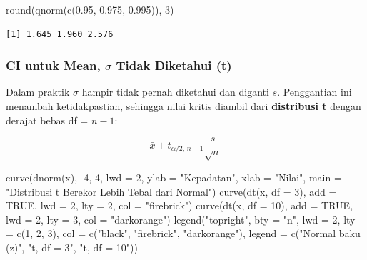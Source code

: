 \documentclass[
  indonesian,
  letterpaper,
]{book}
\newenvironment{Shaded}{\begin{snugshade}}{\end{snugshade}}
\newcommand{\AttributeTok}[1]{\textcolor[rgb]{0.40,0.45,0.13}{#1}}
\newcommand{\ConstantTok}[1]{\textcolor[rgb]{0.56,0.35,0.01}{#1}}
\newcommand{\DecValTok}[1]{\textcolor[rgb]{0.68,0.00,0.00}{#1}}
\newcommand{\FloatTok}[1]{\textcolor[rgb]{0.68,0.00,0.00}{#1}}
\newcommand{\FunctionTok}[1]{\textcolor[rgb]{0.28,0.35,0.67}{#1}}
\newcommand{\NormalTok}[1]{\textcolor[rgb]{0.00,0.23,0.31}{#1}}
\newcommand{\SpecialCharTok}[1]{\textcolor[rgb]{0.37,0.37,0.37}{#1}}
\newcommand{\StringTok}[1]{\textcolor[rgb]{0.13,0.47,0.30}{#1}}
\begin{document}
\begin{Shaded}
\begin{Highlighting}[]
\FunctionTok{round}\NormalTok{(}\FunctionTok{qnorm}\NormalTok{(}\FunctionTok{c}\NormalTok{(}\FloatTok{0.95}\NormalTok{, }\FloatTok{0.975}\NormalTok{, }\FloatTok{0.995}\NormalTok{)), }\DecValTok{3}\NormalTok{)}
\end{Highlighting}
\end{Shaded}

\begin{verbatim}
[1] 1.645 1.960 2.576
\end{verbatim}

\subsubsection{\texorpdfstring{CI untuk Mean, \(\sigma\) Tidak Diketahui
(t)}{CI untuk Mean, \textbackslash sigma Tidak Diketahui (t)}}\label{ci-untuk-mean-sigma-tidak-diketahui-t}

Dalam praktik \(\sigma\) hampir tidak pernah diketahui dan diganti
\(s\). Penggantian ini menambah ketidakpastian, sehingga nilai kritis
diambil dari \textbf{distribusi t} dengan derajat bebas df = \(n-1\):

\[
\bar{x} \pm t_{\alpha/2,\,n-1}\frac{s}{\sqrt{n}}
\]

\begin{Shaded}
\begin{Highlighting}[]
\FunctionTok{curve}\NormalTok{(}\FunctionTok{dnorm}\NormalTok{(x), }\SpecialCharTok{{-}}\DecValTok{4}\NormalTok{, }\DecValTok{4}\NormalTok{, }\AttributeTok{lwd =} \DecValTok{2}\NormalTok{, }\AttributeTok{ylab =} \StringTok{"Kepadatan"}\NormalTok{, }\AttributeTok{xlab =} \StringTok{"Nilai"}\NormalTok{,}
      \AttributeTok{main =} \StringTok{"Distribusi t Berekor Lebih Tebal dari Normal"}\NormalTok{)}
\FunctionTok{curve}\NormalTok{(}\FunctionTok{dt}\NormalTok{(x, }\AttributeTok{df =} \DecValTok{3}\NormalTok{),  }\AttributeTok{add =} \ConstantTok{TRUE}\NormalTok{, }\AttributeTok{lwd =} \DecValTok{2}\NormalTok{, }\AttributeTok{lty =} \DecValTok{2}\NormalTok{, }\AttributeTok{col =} \StringTok{"firebrick"}\NormalTok{)}
\FunctionTok{curve}\NormalTok{(}\FunctionTok{dt}\NormalTok{(x, }\AttributeTok{df =} \DecValTok{10}\NormalTok{), }\AttributeTok{add =} \ConstantTok{TRUE}\NormalTok{, }\AttributeTok{lwd =} \DecValTok{2}\NormalTok{, }\AttributeTok{lty =} \DecValTok{3}\NormalTok{, }\AttributeTok{col =} \StringTok{"darkorange"}\NormalTok{)}
\FunctionTok{legend}\NormalTok{(}\StringTok{"topright"}\NormalTok{, }\AttributeTok{bty =} \StringTok{"n"}\NormalTok{, }\AttributeTok{lwd =} \DecValTok{2}\NormalTok{, }\AttributeTok{lty =} \FunctionTok{c}\NormalTok{(}\DecValTok{1}\NormalTok{, }\DecValTok{2}\NormalTok{, }\DecValTok{3}\NormalTok{),}
       \AttributeTok{col =} \FunctionTok{c}\NormalTok{(}\StringTok{"black"}\NormalTok{, }\StringTok{"firebrick"}\NormalTok{, }\StringTok{"darkorange"}\NormalTok{),}
       \AttributeTok{legend =} \FunctionTok{c}\NormalTok{(}\StringTok{"Normal baku (z)"}\NormalTok{, }\StringTok{"t, df = 3"}\NormalTok{, }\StringTok{"t, df = 10"}\NormalTok{))}
\end{Highlighting}
\end{Shaded}
\end{document}
